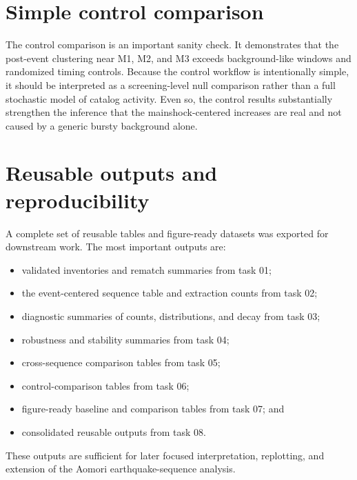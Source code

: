 \documentclass[11pt]{article}
\begin{document}
\section{Simple control comparison}
The control comparison is an important sanity check. It demonstrates that the post-event clustering near M1, M2, and M3 exceeds background-like windows and randomized timing controls. Because the control workflow is intentionally simple, it should be interpreted as a screening-level null comparison rather than a full stochastic model of catalog activity. Even so, the control results substantially strengthen the inference that the mainshock-centered increases are real and not caused by a generic bursty background alone.

\section{Reusable outputs and reproducibility}
A complete set of reusable tables and figure-ready datasets was exported for downstream work. The most important outputs are:
\begin{itemize}[leftmargin=1.2em]
    \item validated inventories and rematch summaries from task 01;
    \item the event-centered sequence table and extraction counts from task 02;
    \item diagnostic summaries of counts, distributions, and decay from task 03;
    \item robustness and stability summaries from task 04;
    \item cross-sequence comparison tables from task 05;
    \item control-comparison tables from task 06;
    \item figure-ready baseline and comparison tables from task 07; and
    \item consolidated reusable outputs from task 08.
\end{itemize}

These outputs are sufficient for later focused interpretation, replotting, and extension of the Aomori earthquake-sequence analysis.
\end{document}
